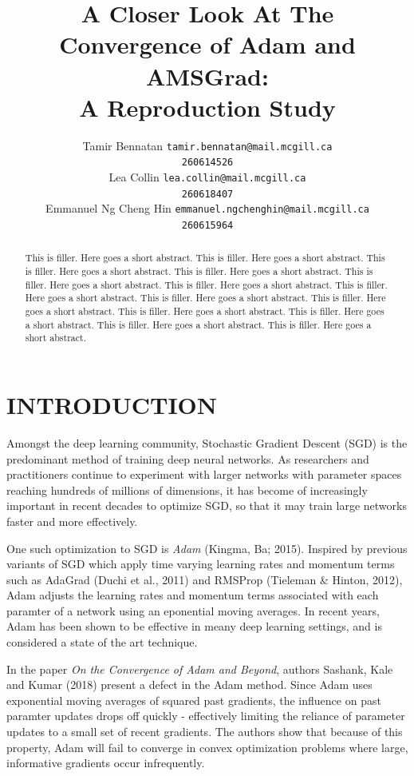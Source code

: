 \documentclass[letterpaper, 10 pt, conference]{ieeeconf}  %
\title{\LARGE \bf
A Closer Look At The Convergence of Adam and AMSGrad:\\A Reproduction Study
}
\author{ 
	\parbox{2 in}{\centering Tamir Bennatan
         {\tt\small tamir.bennatan@mail.mcgill.ca\\}
         {\tt\small 260614526}}
         \hspace*{ 0.3 in}
         \parbox{2 in}{\centering Lea Collin
         {\tt\small lea.collin@mail.mcgill.ca\\}
         {\tt\small 260618407}}
         \hspace*{0.3 in}
         \parbox{2 in}{\centering Emmanuel Ng Cheng Hin
         {\tt\small emmanuel.ngchenghin@mail.mcgill.ca\\}
         {\tt\small 260615964}}
}
\begin{document}
\maketitle
\thispagestyle{empty}
\pagestyle{empty}

\begin{abstract}
This is filler. Here goes a short abstract. This is filler. Here goes a short abstract. This is filler. Here goes a short abstract. This is filler. Here goes a short abstract. This is filler. Here goes a short abstract. This is filler. Here goes a short abstract. This is filler. Here goes a short abstract. This is filler. Here goes a short abstract. This is filler. Here goes a short abstract. This is filler. Here goes a short abstract. This is filler. Here goes a short abstract. This is filler. Here goes a short abstract. This is filler. Here goes a short abstract. 
\end{abstract}

\section{INTRODUCTION}

Amongst the deep learning community, Stochastic Gradient Descent (SGD) is the predominant method of training deep neural networks. As researchers and practitioners continue to experiment with larger networks with parameter spaces reaching hundreds of millions of dimensions, it has become of increasingly important in recent decades to optimize SGD, so that it may train large networks faster and more effectively. 

One such optimization to SGD is \emph{Adam} (Kingma, Ba; 2015). Inspired by previous variants of SGD which  apply time varying learning rates and momentum terms such as AdaGrad (Duchi et al.,
2011) and RMSProp (Tieleman \& Hinton, 2012), Adam adjusts the learning rates and momentum terms associated with each paramter of a network using an eponential moving averages. In recent years, Adam has been shown to be effective in meany deep learning settings, and is considered a state of the art technique. 

In the paper \emph{On the Convergence of Adam and Beyond}, authors Sashank, Kale and Kumar (2018) present a defect in the Adam method. Since Adam uses exponential moving averages of squared past gradients, the influence on past paramter updates drops off quickly - effectively limiting the reliance of parameter updates to a small set of recent gradients. The authors show that because of this property, Adam will fail to converge in convex optimization problems where large, informative gradients occur infrequently. 
\end{document}
